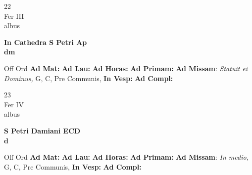 \documentclass[10pt, openany]{book}
\begin{document}
    \begin{center}
        \begin{minipage}{3.5in}
            \vspace{2em}
            \begin{minipage}{0.5in}
                {\Huge 22} \\
                {\normalsize Fer III} \\
                {\normalsize albus}
            \end{minipage}
            \begin{minipage}{3.0in}
                \textbf{ \large In Cathedra S Petri Ap \\
                \textnormal{\normalsize dm}} \\ 
            \end{minipage}
            \begin{justify}Off Ord
                \textbf{Ad Mat: }
                \textbf{Ad Lau: }
                \textbf{Ad Horas: }
                \textbf{Ad Primam: }\textbf{Ad Missam}: \textit{Statuit ei Dominus,} G, C, Pre Communis,  
                \textbf{In Vesp: }
                \textbf{Ad Compl: }
            \end{justify}
        \end{minipage}
    \end{center}

    \begin{center}
        \begin{minipage}{3.5in}
            \vspace{2em}
            \begin{minipage}{0.5in}
                {\Huge 23} \\
                {\normalsize Fer IV} \\
                {\normalsize albus}
            \end{minipage}
            \begin{minipage}{3.0in}
                \textbf{ \large S Petri Damiani ECD \\
                \textnormal{\normalsize d}} \\ 
            \end{minipage}
            \begin{justify}Off Ord
                \textbf{Ad Mat: }
                \textbf{Ad Lau: }
                \textbf{Ad Horas: }
                \textbf{Ad Primam: }\textbf{Ad Missam}: \textit{In medio,} G, C, Pre Communis,  
                \textbf{In Vesp: }
                \textbf{Ad Compl: }
            \end{justify}
        \end{minipage}
    \end{center}
\end{document}
